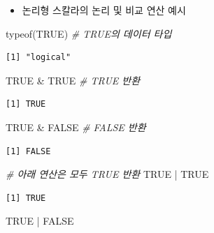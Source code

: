 \documentclass[
  11pt,
]{krantz}
\newenvironment{Shaded}{\begin{snugshade}}{\end{snugshade}}
\newcommand{\CommentTok}[1]{\textcolor[rgb]{0.37,0.37,0.37}{\textit{#1}}}
\newcommand{\ConstantTok}[1]{\textcolor[rgb]{0,0,0}{#1}}
\newcommand{\FunctionTok}[1]{\textcolor[rgb]{0,0,0}{#1}}
\newcommand{\NormalTok}[1]{#1}
\newcommand{\SpecialCharTok}[1]{\textcolor[rgb]{0,0,0}{#1}}
\providecommand{\tightlist}{%
  \setlength{\itemsep}{0pt}\setlength{\parskip}{0pt}}
\begin{document}
\normalsize

\begin{itemize}
\tightlist
\item
  논리형 스칼라의 논리 및 비교 연산 예시
\end{itemize}

\footnotesize

\begin{Shaded}
\begin{Highlighting}[]
\FunctionTok{typeof}\NormalTok{(}\ConstantTok{TRUE}\NormalTok{)  }\CommentTok{\# TRUE의 데이터 타입}
\end{Highlighting}
\end{Shaded}

\begin{verbatim}
[1] "logical"
\end{verbatim}

\begin{Shaded}
\begin{Highlighting}[]
\ConstantTok{TRUE} \SpecialCharTok{\&} \ConstantTok{TRUE}  \CommentTok{\# TRUE 반환}
\end{Highlighting}
\end{Shaded}

\begin{verbatim}
[1] TRUE
\end{verbatim}

\begin{Shaded}
\begin{Highlighting}[]
\ConstantTok{TRUE} \SpecialCharTok{\&} \ConstantTok{FALSE}  \CommentTok{\# FALSE 반환}
\end{Highlighting}
\end{Shaded}

\begin{verbatim}
[1] FALSE
\end{verbatim}

\begin{Shaded}
\begin{Highlighting}[]
\CommentTok{\# 아래 연산은 모두 TRUE 반환}
\ConstantTok{TRUE} \SpecialCharTok{|} \ConstantTok{TRUE}
\end{Highlighting}
\end{Shaded}

\begin{verbatim}
[1] TRUE
\end{verbatim}

\begin{Shaded}
\begin{Highlighting}[]
\ConstantTok{TRUE} \SpecialCharTok{|} \ConstantTok{FALSE}
\end{Highlighting}
\end{Shaded}
\end{document}
